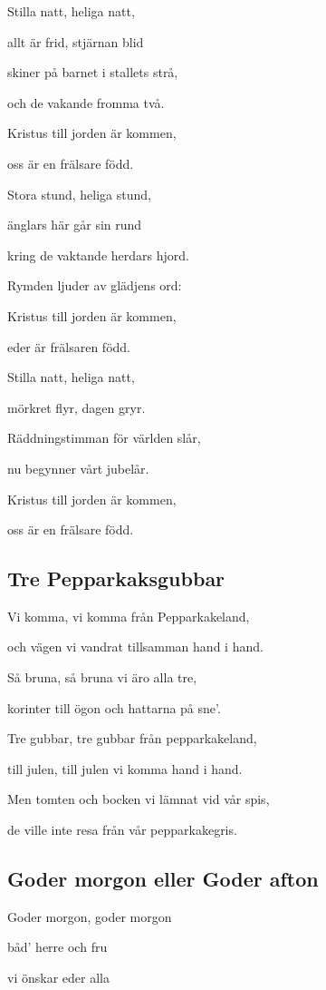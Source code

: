 Stilla natt, heliga natt,

allt är frid, stjärnan blid

skiner på barnet i stallets strå,

och de vakande fromma två.

Kristus till jorden är kommen,

oss är en frälsare född.\bigskip

Stora stund, heliga stund,

änglars här går sin rund

kring de vaktande herdars hjord.

Rymden ljuder av glädjens ord:

Kristus till jorden är kommen,

eder är frälsaren född. \bigskip

Stilla natt, heliga natt,

mörkret flyr, dagen gryr.

Räddningstimman för världen slår,

nu begynner vårt jubelår.

Kristus till jorden är kommen,

oss är en frälsare född.\bigskip

\subsection{\textbf{Tre Pepparkaksgubbar}}

Vi komma, vi komma från Pepparkakeland,

och vägen vi vandrat tillsamman hand i hand.

Så bruna, så bruna vi äro alla tre,

korinter till ögon och hattarna på sne’.\bigskip

Tre gubbar, tre gubbar från pepparkakeland,

till julen, till julen vi komma hand i hand.

Men tomten och bocken vi lämnat vid vår spis,

de ville inte resa från vår pepparkakegris.\bigskip

\subsection{\textbf{Goder morgon eller Goder afton}}

Goder morgon, goder morgon

båd’ herre och fru

vi önskar eder alla

